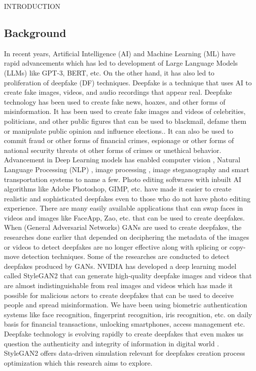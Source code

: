 \begin{section}[]{\uppercase{Introduction}}


    \subsection{Background}
    In recent years, Artificial Intelligence (AI) and Machine Learning (ML) have rapid advancements which has led to development of Large Language Models (LLMs) like GPT-3, BERT, etc. 
    On the other hand, it has also led to proliferation of deepfake (DF) techniques. 
    Deepfake is a technique that uses AI to create fake images, videos, and audio recordings that appear real. 
    Deepfake technology has been used to create fake news, hoaxes, and other forms of misinformation. 
    It has been used to create fake images and videos of celebrities, politicians, and other public figures that can be used to blackmail, defame them or manipulate public opinion and influence elections.. 
    It can also be used to commit fraud or other forms of financial crimes, espionage or other forms of national security threats ot other forms of crimes or unethical behavior. \cite{Gaur2022}
    Advancement in Deep Learning models has enabled computer vision \cite{Guo2022}, Natural Language Processing (NLP) \cite{Shahi2021}, image processing \cite{Sitaula2022}, image steganography \cite{Bhandari2022} and smart transportation systems \cite{Gaur2022} to name a few.
    Photo editing softwares with inbuilt AI algorithms like Adobe Photoshop, GIMP, etc. have made it easier to create realistic and sophisticated deepfakes even to those who do not have photo editing experience. \cite{Wang2020}
    There are many easily available applications that can swap faces in videos and images like FaceApp, Zao, etc. that can be used to create deepfakes.
    When (General Adversarial Networks) GANs are used to create deepfakes, the researches done earlier that depended on deciphering the metadata of the images or videos to detect deepfakes are no longer effective along with splicing or copy-move detection techniques. Some of the researches are conducted to detect deepfakes produced by GANs. \cite{Li2022}
    NVIDIA has developed a deep learning model called StyleGAN2 that can generate high-quality deepfake images and videos that are almost indistinguishable from real images and videos which has made it possible for malicious actors to create deepfakes that can be used to deceive people and spread misinformation. \cite{Wong2022}
    We have been using biometric authentication systems like face recognition, fingerprint recognition, iris recognition, etc. on daily basis for financial transactions, unlocking smartphones, access management etc. \cite{Tran2017}
    Deepfake technology is evolving rapidly to create deepfakes that even makes us question the authenticity and integrity of information in digital world \Cites{Dang2020}{Rossler2019}.
    StyleGAN2 offers data-driven simulation relevant for deepfakes creation process optimization \cite{Zotov2022} which this research aims to explore.


\end{section}
